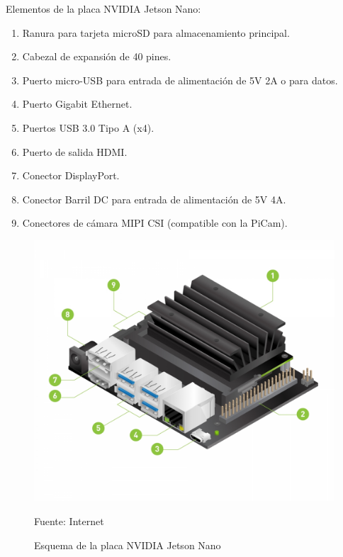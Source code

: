 Elementos de la placa NVIDIA Jetson Nano:

\begin{enumerate}
  \item Ranura para tarjeta microSD para almacenamiento principal.
  \item Cabezal de expansión de 40 pines.
  \item Puerto micro-USB para entrada de alimentación de 5V 2A o para datos.
  \item Puerto Gigabit Ethernet.
  \item Puertos USB 3.0 Tipo A (x4).
  \item Puerto de salida HDMI.
  \item Conector DisplayPort.
  \item Conector Barril DC para entrada de alimentación de 5V 4A.
  \item Conectores de cámara MIPI CSI (compatible con la PiCam).
\end{enumerate}

\begin{figure}[H]
  \centering
  \includegraphics[scale = 0.5]{Imagenes/jetson_nano_esquema.jpg}
  \caption{Esquema de la placa NVIDIA Jetson Nano}{Fuente: Internet}
\end{figure}